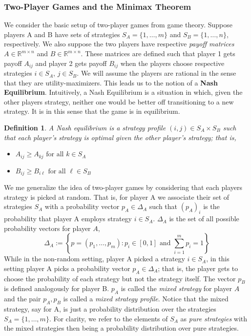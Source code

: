 \documentclass[12pt]{article}
\newcommand{\R}{\mathcal{R}}
\def\R{\mathbb{R}}
\newtheorem{definition}{Definition}
\begin{document}
\subsubsection{Two-Player Games and the Minimax Theorem}
We consider the basic setup of two-player games from game theory. Suppose players A and B have sets of strategies $S_A = \{1, \dots, m\}$ and 
$S_B = \{1, \dots, n\}$, respectively. We also suppose the two players have respective \textit{payoff matrices} $A \in \R^{m \times n}$ and 
$B \in \R^{m \times n}$. These matrices are defined such that player 1 gets payoff $A_{ij}$ and player 2 gets payoff $B_{ij}$ when 
the players choose respective strategies $i \in S_A$, $j \in S_B$. We will assume the players are rational in the sense that they are utility-maximizers. 
This leads us to the notion of a \textbf{Nash Equilibrium}. Intuitively, a Nash Equilibrium is a situation in which, given the other players strategy, neither one
would be better off transitioning to a new strategy. It is in this sense that the game is in equilibrium. 
\begin{definition}
 A Nash equilibrium is a strategy profile $(i, j) \in S_A \times S_B$ such that each player's strategy is optimal given the other player's strategy; that is, 
 \begin{itemize}
 \item $A_{ij} \geq A_{kj} \text{ for all } k \in S_A$ 
 \item $B_{ij} \geq B_{i\ell} \text{ for all } \ell \in S_B$
 \end{itemize}
\end{definition}

We me generalize the idea of two-player games by considering that each players strategy is picked at random. That is, for player A we associate their 
set of strategies $S_A$ with a probability vector $p_A \in \Delta_A$ such that $(p_A)_i$ is the probability that player A employs strategy $i \in S_A$. 
$\Delta_A$ is the set of all possible probability vectors for player $A$,
\[ \Delta_A := \left\{p = (p_1, \dots, p_m) : p_i \in [0, 1] \text{ and } \sum_{i = 1}^{m} p_i = 1\right\} \]
While in the non-random setting, player A picked a strategy $i \in S_A$, in this setting player A picks a probability vector $p_A \in \Delta_A$; that is, the player 
gets to choose the probability of each strategy but not the strategy itself. 
The vector $p_B$ is defined analogously for player B. 
$p_A$ is called the \textit{mixed strategy} for player $A$ and the pair $p_A, p_B$ is called a \textit{mixed strategy profile}. Notice that the mixed strategy, say for A, is just 
a probability distribution over the strategies $S_A =\{1, \dots, m\}$. For clarity, we refer to the elements of $S_A$ as \textit{pure strategies} with the mixed strategies 
then being a probability distribution over pure strategies. 
\end{document}
